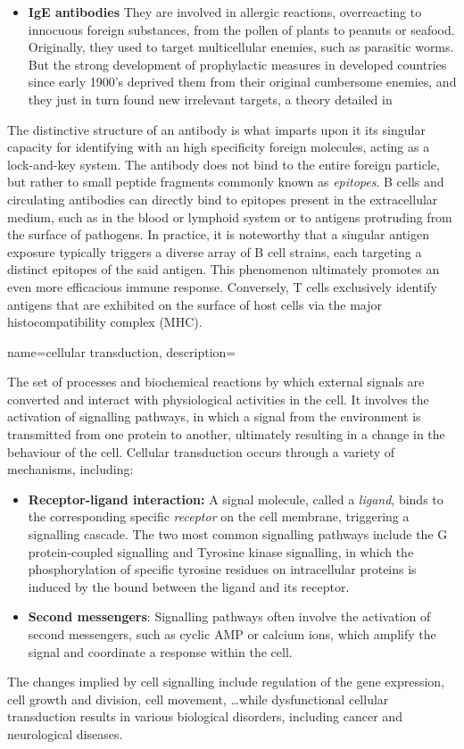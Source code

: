 {{\begin{itemize}
    \item \textbf{IgE antibodies} They are involved in allergic reactions, overreacting to innocuous foreign substances, from the pollen of plants to peanuts or seafood. Originally, they used to target multicellular enemies, such as parasitic worms. But the strong development of prophylactic measures in developed countries since early 1900's deprived them from their original cumbersome enemies, and they just in turn found new irrelevant targets, a theory detailed in \autocite[Chapter 39]{dettmer21} 
\end{itemize}
The distinctive structure of an antibody is what imparts upon it its singular capacity for identifying 
with an high specificity foreign molecules, acting as a lock-and-key system. 
The antibody does not bind to the entire foreign particle, but rather to small peptide fragments commonly known as \emph{epitopes}.
B cells and circulating antibodies can directly bind to epitopes present in the extracellular medium, 
such as in the blood or lymphoid system or to antigens protruding from the surface of pathogens.
In practice, it is noteworthy that a singular antigen exposure typically triggers a diverse array of
 B cell strains, each targeting a distinct epitopes of the said antigen. This phenomenon ultimately promotes 
 an even more efficacious immune response. 
 Conversely, T cells exclusively identify antigens that are exhibited on the surface of host cells 
 via the major histocompatibility complex (MHC).}}



{name=cellular transduction, 
description={The set of processes and biochemical reactions by which  external signals are converted and interact with physiological activities in the cell. It involves the activation of signalling pathways, in which a signal from the environment is transmitted from one protein to another, ultimately resulting in a change in the behaviour of the cell. Cellular transduction occurs through a variety of mechanisms, including:
\begin{itemize}
    \item \textbf{Receptor-ligand interaction:} A signal molecule, called a \textit{ligand}, binds to the corresponding specific \textit{receptor} on the cell membrane, triggering a signalling cascade. The two most common signalling pathways include the G protein-coupled signalling and Tyrosine kinase signalling, in which the phosphorylation of specific tyrosine residues on intracellular proteins is induced by the bound between the ligand and its receptor.
    \item \textbf{Second messengers}: Signalling pathways often involve the activation of second messengers, such as cyclic AMP or calcium ions, which amplify the signal and coordinate a response within the cell.
\end{itemize}
The changes implied by cell signalling include regulation of the gene expression, cell growth and division, cell movement, \ldots while dysfunctional cellular transduction results in various biological disorders, including cancer and neurological diseases.}}

